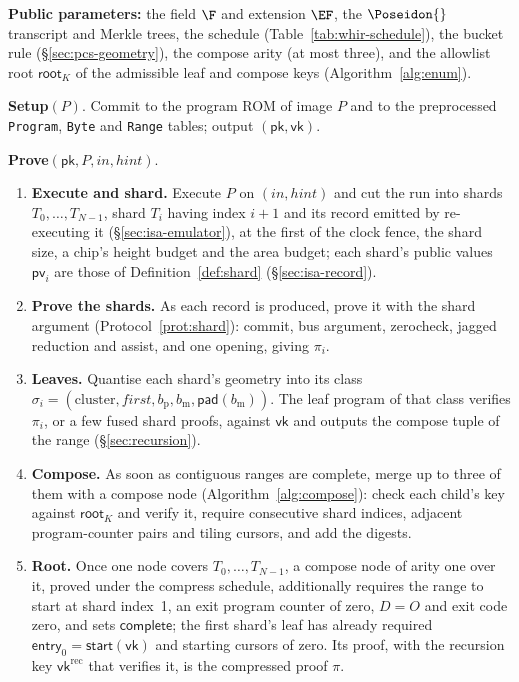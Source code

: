 \begin{protocol}
\label{prot:block}
\textbf{Public parameters:} the field $\F$ and extension $\EF$, the $\Poseidon{}$ transcript and Merkle trees, the \WHIR{} schedule (Table~\ref{tab:whir-schedule}), the bucket rule (\S\ref{sec:pcs-geometry}), the compose arity (at most three), and the allowlist root $\mathsf{root}_K$ of the admissible leaf and compose keys (Algorithm~\ref{alg:enum}).

\smallskip
\noindent\textbf{Setup}$(P)$. Commit to the program ROM of image $P$ and to the preprocessed \texttt{Program}, \texttt{Byte} and \texttt{Range} tables; output $(\mathsf{pk}, \mathsf{vk})$.

\smallskip
\noindent\textbf{Prove}$(\mathsf{pk}, P, \mathit{in}, \mathit{hint})$.
\begin{enumerate}
  \item \textbf{Execute and shard.} Execute $P$ on $(\mathit{in}, \mathit{hint})$ and cut the run into shards $T_0, \dots, T_{N-1}$, shard $T_i$ having index $i+1$ and its record emitted by re-executing it (\S\ref{sec:isa-emulator}), at the first of the clock fence, the shard size, a chip's height budget and the area budget; each shard's public values $\mathsf{pv}_i$ are those of Definition~\ref{def:shard} (\S\ref{sec:isa-record}).
  \item \textbf{Prove the shards.} As each record is produced, prove it with the shard argument (Protocol~\ref{prot:shard}): commit, bus argument, zerocheck, jagged reduction and assist, and one \WHIR{} opening, giving $\pi_i$.
  \item \textbf{Leaves.} Quantise each shard's geometry into its class $\sigma_i = (\text{cluster}, \mathit{first}, b_{\mathrm p}, b_{\mathrm m}, \mathsf{pad}(b_{\mathrm m}))$. The leaf program of that class verifies $\pi_i$, or a few fused shard proofs, against $\mathsf{vk}$ and outputs the compose tuple of the range (\S\ref{sec:recursion}).
  \item \textbf{Compose.} As soon as contiguous ranges are complete, merge up to three of them with a compose node (Algorithm~\ref{alg:compose}): check each child's key against $\mathsf{root}_K$ and verify it, require consecutive shard indices, adjacent program-counter pairs and tiling cursors, and add the digests.
  \item \textbf{Root.} Once one node covers $T_0, \dots, T_{N-1}$, a compose node of arity one over it, proved under the compress schedule, additionally requires the range to start at shard index~1, an exit program counter of zero, $D = O$ and exit code zero, and sets $\mathsf{complete}$; the first shard's leaf has already required $\mathsf{entry}_0 = \mathsf{start}(\mathsf{vk})$ and starting cursors of zero. Its proof, with the recursion key $\mathsf{vk}^{\mathrm{rec}}$ that verifies it, is the compressed proof $\pi$.
\end{enumerate}


\end{protocol}
